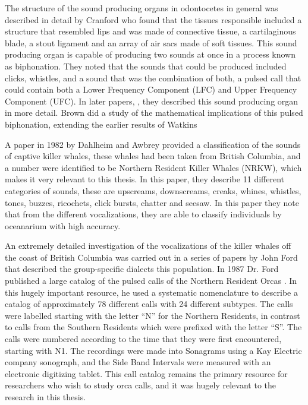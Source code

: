 The structure of the sound producing organs in odontocetes in general
was described in detail by Cranford \cite{cranford96} who found that
the tissues responsible included a structure that resembled lips and
was made of connective tissue, a cartilaginous blade, a stout ligament
and an array of air sacs made of soft tissues.  This sound producing
organ is capable of producing two sounds at once in a process known as
biphonation.  They noted that the sounds that could be produced
included clicks, whistles, and a sound that was the combination of
both, a pulsed call that could contain both a Lower Frequency
Component (LFC) and Upper Frequency Component (UFC).  In later papers,
\cite{cranford00} \cite{cranford06}, they described this sound
producing organ in more detail.  Brown \cite{brown08} did a study of
the mathematical implications of this pulsed biphonation, extending
the earlier results of Watkins \cite{watkins67}

A paper in 1982 by Dahlheim and Awbrey \cite{dahlheim82} provided a
classification of the sounds of captive killer whales, these whales
had been taken from British Columbia, and a number were identified to
be Northern Resident Killer Whales (NRKW), which makes it very relevant to
this thesis.  In this paper, they describe 11 different categories of
sounds, these are upscreams, downscreams, creaks, whines, whistles,
tones, buzzes, ricochets, click bursts, chatter and seesaw.  In this
paper they note that from the different vocalizations, they are able
to classify individuals by oceanarium with high accuracy.  

An extremely detailed investigation of the vocalizations of the killer
whales off the coast of British Columbia was carried out in a series
of papers by John Ford \cite{ford82} \cite{ford83} that described
the group-specific dialects this population.  In 1987 Dr. Ford
published a large catalog of the pulsed calls of the Northern Resident
Orcas \cite{ford87}.  In this hugely important resource, he used a
systematic nomenclature to describe a catalog of approximately 78
different calls with 24 different subtypes.  The calls were labelled
starting with the letter ``N'' for the Northern Residents, in contrast
to calls from the Southern Residents which were prefixed with the
letter ``S''.  The calls were numbered according to the time that they
were first encountered, starting with N1.  The recordings were made
into Sonagrams using a Kay Electric company sonograph, and the Side
Band Intervals were measured with an electronic digitizing tablet.
This call catalog remains the primary resource for researchers who
wish to study orca calls, and it was hugely relevant to the research
in this thesis.

